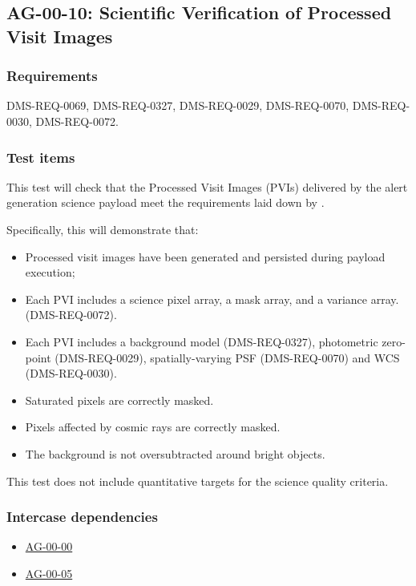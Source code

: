 \subsection{AG-00-10: Scientific Verification of Processed Visit Images}
\label{ag-00-10}

\subsubsection{Requirements}

DMS-REQ-0069, DMS-REQ-0327, DMS-REQ-0029, DMS-REQ-0070,
DMS-REQ-0030, DMS-REQ-0072.

\subsubsection{Test items}
\label{ag-00-10-items}

This test will check that the Processed Visit Images (PVIs) delivered by the
alert generation science payload meet the requirements laid down by .

Specifically, this will demonstrate that:

\begin{itemize}

  \item{Processed visit images have been generated and persisted during
  payload execution;}
  \item{Each PVI includes a science pixel array, a mask array, and a variance array. (DMS-REQ-0072).}
  \item{Each PVI includes a background model (DMS-REQ-0327), photometric
  zero-point (DMS-REQ-0029), spatially-varying PSF (DMS-REQ-0070) and WCS
  (DMS-REQ-0030).}
  \item{Saturated pixels are correctly masked.}
  \item{Pixels affected by cosmic rays are correctly masked.}
  \item{The background is not oversubtracted around bright objects.}

\end{itemize}

This test does not include quantitative targets for the science quality criteria.

\subsubsection{Intercase dependencies}

\begin{itemize}

  \item{\hyperref[ag-00-00]{AG-00-00}}
  \item{\hyperref[ag-00-05]{AG-00-05}}

\end{itemize}

